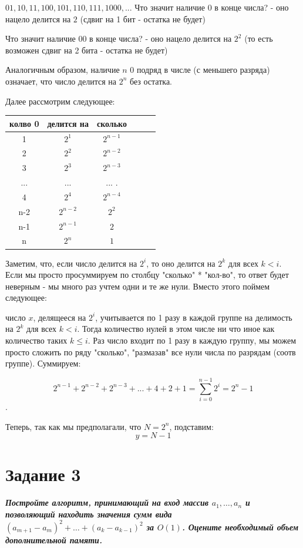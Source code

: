 \documentclass{article}
\begin{document}
$01, 10, 11, 100, 101, 110, 111, 1000, ...$
Что значит наличие 0 в конце числа? - оно нацело делится на $2$ (сдвиг на 1 бит - остатка не будет)

Что значит наличие 00 в конце числа? - оно нацело делится на $2^2$ (то есть возможен сдвиг на 2 бита - остатка не будет)

Аналогичным образом, наличие $n$ 0 подряд в числе (с меньшего разряда) означает, что число делится на $2^n$ без остатка.

Далее рассмотрим следующее:

\begin{center}
\begin{tabular}{ |c|c|c|c|c|c| } 
\hline
колво 0 & делится на & сколько  \\ 
\hline
1 & $2^1$ & $2^{n-1}$  \\ 
2 & $2^2$ &  $2^{n-2}$  \\ 
3 & $2^3$ &  $2^{n-3}$  \\ 
... & ... &  ... .\\
4 & $2^4$ &  $2^{n-4}$ \\ 
n-2 & $2^{n-2}$ &  $2^2$\\ 
n-1 & $2^{n-1}$ &  $2$  \\ 
n & $2^{n}$ &  $1$  \\ 
\hline
\end{tabular}
\end{center}

Заметим, что, если число делится на $2^i$, то оно делится на $2^k$ для всех $k < i$. Если мы просто просуммируем по столбцу "сколько" * "кол-во", то ответ будет неверным - мы много раз учтем одни и те же нули. Вместо этого поймем следующее:

число $x$, делящееся на $2^i$, учитывается по 1 разу в каждой группе на делимость на $2^k$ для всех $k < i$. Тогда количество нулей в этом числе ни что иное как количество таких $k \leq i$. Раз число входит по 1 разу в каждую группу, мы можем просто сложить по ряду "сколько", "размазав" все нули числа по разрядам (соотв группе). Суммируем:

$$2^{n-1} + 2^{n-2} + 2^{n-3} + ... + 4 + 2 + 1= \sum_{i=0}^{n-1} 2^i = 2^n - 1 $$.

Теперь, так как мы предполагали, что $N = 2^n$, подставим:
$$y = N - 1$$

\bigskip



\section*{\textbf{Задание 3}} \textbf{\textit{Постройте алгоритм, принимающий на вход массив $a_1, \dots, a_n$ и позволяющий находить значения сумм вида $(a_{m+1} - a_m)^2 + \dots + (a_{k} - a_{k-1})^2$ за $O(1)$. Оцените необходимый объем дополнительной памяти.}}
\end{document}

